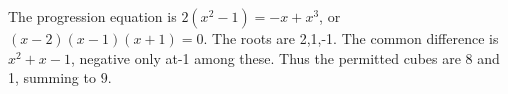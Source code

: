 The progression equation is $2(x^2-1)=-x+x^3$, or $(x-2)(x-1)(x+1)=0$. The roots are 2,1,-1. The common difference is $x^2+x-1$, negative only at-1 among these. Thus the permitted cubes are 8 and 1, summing to $\boxed9$.
